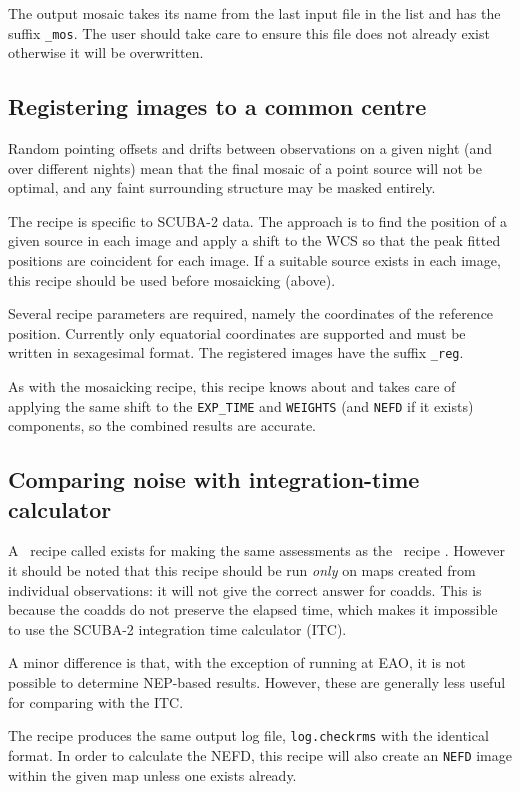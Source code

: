 The output mosaic takes its name from the last input file in the list
and has the suffix \verb+_mos+. The user should take care to ensure
this file does not already exist otherwise it will be overwritten.

\subsection{Registering images to a common centre\label{se:reg}}

Random pointing offsets and drifts between observations on a given
night (and over different nights) mean that the final mosaic of a
point source will not be optimal, and any faint surrounding structure
may be masked entirely.

The recipe  is specific to SCUBA-2
data. The approach is to find the position of a given source in each
image and apply a shift to the WCS so that the peak fitted positions
are coincident for each image. If a suitable source exists in each
image, this recipe should be used before mosaicking (above).

Several recipe parameters are required, namely the coordinates of the
reference position. Currently only equatorial coordinates are
supported and must be written in sexagesimal format. The registered
images have the suffix \verb+_reg+.

As with the mosaicking recipe, this recipe knows about and takes care
of applying the same shift to the \verb+EXP_TIME+ and \verb+WEIGHTS+
(and \verb+NEFD+ if it exists) components, so the combined results are
accurate.

\subsection{Comparing noise with integration-time calculator\label{se:checkrms}}

A \picard\ recipe called  exists for making
the same assessments as the \oracdr\ recipe
. However it should be noted that this
recipe should be run \textit{only} on maps created from individual
observations: it will not give the correct answer for coadds. This is
because the coadds do not preserve the elapsed time, which makes it
impossible to use the SCUBA-2 integration time calculator (ITC).

A minor difference is that, with the exception of running at EAO, it
is not possible to determine NEP-based results. However, these are
generally less useful for comparing with the ITC.

The recipe produces the same output log file, \texttt{log.checkrms}
with the identical format. In order to calculate the NEFD, this recipe
will also create an \verb+NEFD+ image within the given map unless one
exists already.

